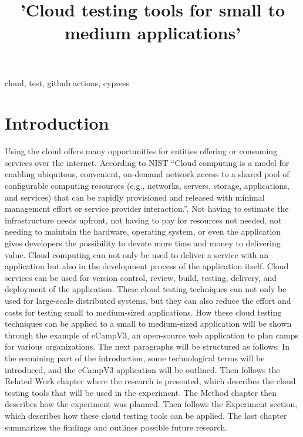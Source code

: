 \documentclass[conference]{IEEEtran}
\begin{document}
\title{'Cloud testing tools for small to medium applications'}

\author{
}

\maketitle

\begin{abstract}
	
\end{abstract}

\begin{IEEEkeywords}
	cloud, test, github actions, cypress
\end{IEEEkeywords}

\section{Introduction}

Using the cloud offers many opportunities for entities offering or consuming services over the internet.
According to NIST \enquote{Cloud computing is a model for enabling ubiquitous, convenient, on-demand network access to a shared
	pool of configurable computing resources (e.g., networks, servers, storage, applications, and services) that
	can be rapidly provisioned and released with minimal management effort or service provider interaction.}\cite{mell2011nist}.
Not having to estimate the infrastructure needs upfront, not having to pay for resources not needed, not needing to maintain
the hardware, operating system, or even the application gives developers the possibility to devote more time and money
to delivering value.
Cloud computing can not only be used to deliver a service with an application but also in the development process of
the application itself.
Cloud services can be used for version control, review, build, testing, delivery, and deployment of the application.
These cloud testing techniques can not only be used for large-scale distributed systems, but they can also reduce the
effort and costs for testing small to medium-sized applications.
How these cloud testing techniques can be applied to a small to medium-sized application will be shown through the example
of eCampV3, an open-source web application to plan camps for various organizations.
The next paragraphs will be structured as follows:
In the remaining part of the introduction, some technological terms will be introduced, and the eCampV3 application will be
outlined.
Then follows the Related Work chapter where the research is presented, which describes the cloud testing tools that
will be used in the experiment.
The Method chapter then describes how the experiment was planned.
Then follows the Experiment section, which describes how these cloud testing tools can be applied.
The last chapter summarizes the findings and outlines possible future research.
\end{document}
